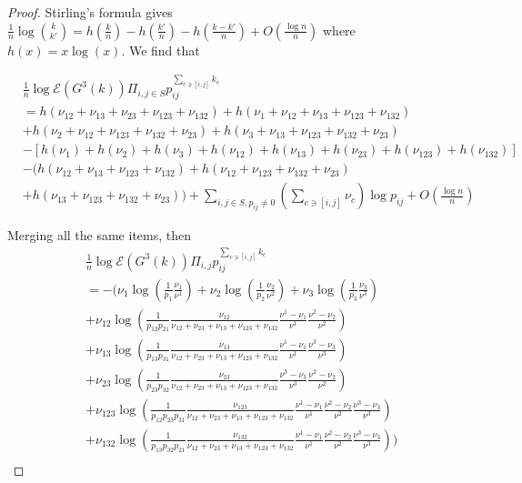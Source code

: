 \documentclass[11pt,en,cite=authoryear]{elegantpaper}
\begin{document}
\begin{proof}
    Stirling's formula gives
    $\frac{1}{n} \log \binom{k}{k'} = h(\frac{k}{n} ) - h(\frac{k'}{n}) - h(\frac{k-k'}{n}) + O(\frac{\log n}{n})$
    where $h(x)=x\log(x)$. We find that

    \begin{align*}
        &\frac{1}{n} \log \mathcal{E} (G^3(k)) \Pi_{i, j \in S} p_{ij}^{\sum_{c \ni [i,j]} k_{c}} \\
        &= h(\nu_{12} + \nu_{13} + \nu_{23}+\nu_{123}+\nu_{132}) 
        + h(\nu_1 + \nu_{12} + \nu_{13} + \nu_{123} +\nu_{132}) \\
        &+ h(\nu_2 + \nu_{12} + \nu_{123} + \nu_{132} +\nu_{23})
        + h(\nu_3 + \nu_{13} +\nu_{123} +\nu_{132} +\nu_{23}) \\
        &- \left[h(\nu_1) + h(\nu_2) + h(\nu_3) + h(\nu_{12}) + h(\nu_{13}) + h(\nu_{23}) + h(\nu_{123}) + h(\nu_{132})\right] \\
        &- \biggl(h(\nu_{12} + \nu_{13} + \nu_{123} +\nu_{132}) + h(\nu_{12} + \nu_{123} + \nu_{132} +\nu_{23}) \\
        & + h(\nu_{13} +\nu_{123} +\nu_{132} +\nu_{23})\biggr)
        +\sum_{i, j \in S, p_{ij}\neq 0} (\sum_{c \ni[i, j]} \nu_{c}) \log p_{ij} + O(\frac{\log n}{n})
    \end{align*}

    Merging all the same items, then
    \begin{align*}
        &\frac{1}{n} \log \mathcal{E} (G^3(k)) \Pi_{i, j} p_{ij}^{\sum_{c \ni [i,j]} k_{c}} \\
        &= -\biggl(
        \nu_1 \log(\frac{1}{p_{1}} \frac{\nu_1}{\nu^1})
        + \nu_2 \log(\frac{1}{p_{2}} \frac{\nu_2}{\nu^2})
        + \nu_3 \log(\frac{1}{p_{3}} \frac{\nu_3}{\nu^3}) \\
        &+\nu_{12} \log(\frac{1}{p_{12}p_{21}} \frac{\nu_{12}}{\nu_{12}+\nu_{23}+\nu_{13}+\nu_{123}+\nu_{132}} 
        \frac{\nu^{1}-\nu_{1}}{\nu^{1}}\frac{\nu^{2}-\nu_{2}}{\nu^{2}}) \\
        &+ \nu_{13} \log(\frac{1}{p_{13}p_{31}} \frac{\nu_{13}}{\nu_{12}+\nu_{23}+\nu_{13}+\nu_{123}+\nu_{132}}
        \frac{\nu^{1}-\nu_{1}}{\nu^{1}}\frac{\nu^{3}-\nu_{3}}{\nu^{3}}) \\
        &+ \nu_{23} \log(\frac{1}{p_{23}p_{32}} \frac{\nu_{23}}{\nu_{12}+\nu_{23}+\nu_{13}+\nu_{123}+\nu_{132}} 
        \frac{\nu^{3}-\nu_{3}}{\nu^{3}}\frac{\nu^{2}-\nu_{2}}{\nu^{2}}) \\
        &+ \nu_{123} \log(\frac{1}{p_{12}p_{23}p_{31}} \frac{\nu_{123}}{\nu_{12}+\nu_{23}+\nu_{13}+\nu_{123}+\nu_{132}}
        \frac{\nu^{1}-\nu_{1}}{\nu^{1}}\frac{\nu^{2}-\nu_{2}}{\nu^{2}} \frac{\nu^{3}-\nu_{3}}{\nu^{3}}) \\
        &+ \nu_{132} \log(\frac{1}{p_{13}p_{32}p_{21}} \frac{\nu_{132}}{\nu_{12}+\nu_{23}+\nu_{13}+\nu_{123}+\nu_{132}}
        \frac{\nu^{1}-\nu_{1}}{\nu^{1}}\frac{\nu^{2}-\nu_{2}}{\nu^{2}} \frac{\nu^{3}-\nu_{3}}{\nu^{3}}) \biggr)\\
    \end{align*}


\end{proof}
\end{document}
